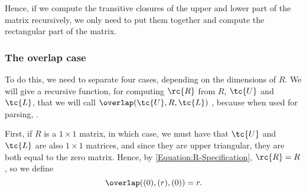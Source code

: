 Hence, if we compute the transitive closures of the upper and lower part of the matrix recursively, we only need to put them together and compute the rectangular part of the matrix.
\subsubsection{The overlap case}
\label{Section:Two-Step-Splitting}
To do this, we need to separate four cases, depending on the dimensions of $R$. We will give a recursive function, for computing $\rc{R}$ from $R$, $\tc{U}$ and $\tc{L}$, that we will call $\overlap(\tc{U}, R, \tc{L})$ , because when used for parsing, . 

First, if $R$ is a $1 \times 1$ matrix, in which case, we must have that $\tc{U}$ and $\tc{L}$ are also $1 \times 1$ matrices, and since they are upper triangular, they are both equal to the zero matrix. Hence, by \eqref{Equation:R-Specification}, $\rc{R} = R$, so we define 
\begin{equation}
  \label{overlap1}
  \overlap((0), (r), (0)) = r.
\end{equation}

